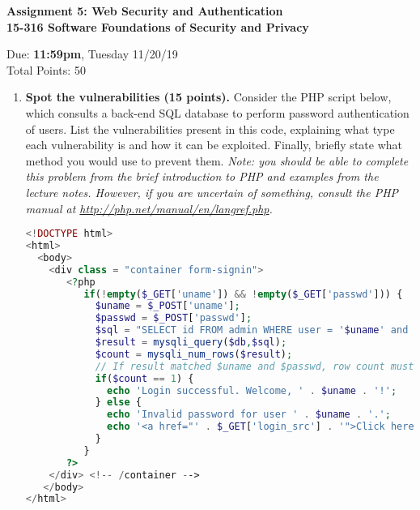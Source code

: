 \documentclass[10pt]{article}
\begin{document}
\begin{center}
\textbf{ Assignment 5: Web Security and Authentication\\15-316 Software Foundations of Security and Privacy}\\
\end{center}
Due: \textbf{ 11:59pm}, Tuesday 11/20/19 \\
Total Points: 50

\vspace{-5mm}

\begin{enumerate}
\item \textbf{Spot the vulnerabilities (15 points).} Consider the PHP script below, which consults a back-end SQL database to perform password authentication of users. List the vulnerabilities present in this code, explaining what type each vulnerability is and how it can be exploited. Finally, briefly state what method you would use to prevent them. \emph{Note: you should be able to complete this problem from the brief introduction to PHP and examples from the lecture notes. However, if you are uncertain of something, consult the PHP manual at \href{http://php.net/manual/en/langref.php}{http://php.net/manual/en/langref.php}.}

\begin{lstlisting}[language=PHP]
<!DOCTYPE html>
<html>
  <body>
    <div class = "container form-signin">
       <?php
          if(!empty($_GET['uname']) && !empty($_GET['passwd'])) {
            $uname = $_POST['uname'];
            $passwd = $_POST['passwd'];
            $sql = "SELECT id FROM admin WHERE user = '$uname' and pass = '$passwd'";
            $result = mysqli_query($db,$sql);
            $count = mysqli_num_rows($result);            
            // If result matched $uname and $passwd, row count must be 1
            if($count == 1) {
              echo 'Login successful. Welcome, ' . $uname . '!';
            } else {
              echo 'Invalid password for user ' . $uname . '.';
              echo '<a href="' . $_GET['login_src'] . '">Click here</a> to try again.'
            }
          }
       ?>
    </div> <!-- /container -->
   </body>
</html>
\end{lstlisting}
\ \\[1em]

\newpage


\end{enumerate}
\end{document}
